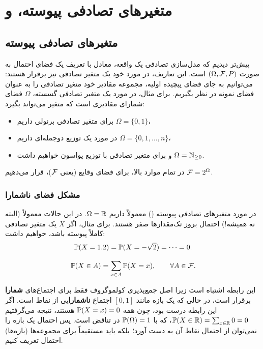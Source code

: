 \chapter{متغیرهای تصادفی پیوسته،  و }

\section[متغیرهای تصادفی پیوسته]{متغیرهای تصادفی پیوسته {\large{}}}

پیش‌تر دیدیم که مدل‌سازی تصادفی یک واقعه، معادل با تعریف یک فضای احتمال به صورت $(\Omega,\mathcal{F},P)$ است. این تعاریف، در مورد خود یک متغیر تصادفی نیز برقرار هستند: می‌توانیم به جای فضای پیچیده اولیه، مجموعه مقادیر خود متغیر تصادفی را به عنوان فضای نمونه در نظر بگیریم. برای مثال، در مورد یک \textcolor{red!70!black}{متغیر تصادفی گسسته}، $\Omega$ فضای شمارای مقادیری است که متغیر می‌تواند بگیرد:
\begin{itemize}
\item برای متغیر تصادفی برنولی داریم $\Omega=\{0,1\}$،
\item در مورد یک توزیع دوجمله‌ای داریم $\Omega=\{0,1,\ldots,n\}$،
\item و برای متغیر تصادفی با توزیع پواسون خواهیم داشت $\Omega=\mathbb{N}_{\ge0}$.
\end{itemize}
در تمام موارد بالا، برای فضای وقایع (یعنی $\mathcal{F}$)، قرار می‌دهیم $\mathcal{F}=2^\Omega$.

\subsection{مشکل فضای ناشمارا}
در مورد متغیرهای تصادفی پیوسته () معمولاً داریم $\Omega=\mathbb{R}$. در این حالات معمولاً (البته نه همیشه!) احتمال بروز تک‌مقدارها صفر هستند. برای مثال، اگر $X$ یک متغیر تصادفی کاملاً پیوسته باشد، خواهیم داشت:
\[
\mathbb{P}(X=1.2)=\mathbb{P}(X=-\sqrt2)=\cdots=0 .
\]

\begin{question}
\[
\mathbb{P}(X\in A)=\sum_{x\in A}\mathbb{P}(X=x),\qquad\forall A\in\mathcal{F} .
\]
\begin{answer}
این رابطه اشتباه است زیرا اصل جمع‌پذیری کولموگروف فقط برای اجتماع‌های \textbf{شمارا} برقرار است، در حالی که یک بازه مانند $[0,1]$ اجتماع \textbf{ناشمارا}یی از نقاط است. اگر این رابطه درست بود، چون همه $\mathbb{P}(X=x)=0$ هستند، نتیجه می‌گرفتیم $\mathbb{P}(X\in\mathbb{R})=\sum_{x\in\mathbb{R}}0=0$، که با $\mathbb{P}(\Omega)=1$ در تناقض است. پس احتمال یک بازه را نمی‌توان از احتمال نقاط آن به دست آورد؛ بلکه باید مستقیماً برای مجموعه‌ها (بازه‌ها) احتمال تعریف کنیم.
\end{answer}
\end{question}

